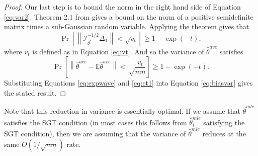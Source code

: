 \documentclass[twoside]{article}
\DeclareMathOperator*{\tr}{tr}
\newcommand{\zero}{\text{\textbf{0}}}
\newcommand{\E}{\mathbb{E}}
\newcommand{\w}{\theta}
\newcommand{\wave}{\hat\w^{ave}}
\newcommand{\wtave}{\E\hat\w^{ave}}
\newcommand{\wmle}{\hat\w^{mle}}
\newcommand{\wstar}{{\w^{*}}}
\newcommand{\I}{\mathcal I}
\newcommand{\normal}[2]{\ensuremath{\mathcal{N}\left({{#1}},{{#2}}\right)}}
\newcommand{\ltwo}[1]{{\lVert {#1} \rVert}}
\newcommand{\ltwobig}[1]{{\left\lVert {#1} \right\rVert}}
\newcommand{\prob}[1]{\Pr\left[{#1}\right]}
\begin{document}
\begin{proof}

Our last step is to bound the norm in the right hand side of Equation \ref{eq:var2}.
Theorem 2.1 from \cite{hsu2012tail} gives a bound on the norm of a positive semidefinite matrix times a sub-Gaussian random variable.
Applying the theorem gives that %
\begin{equation}
\prob{
    \ltwobig{\I^{-1/2}_\wstar\Delta_1} < \sqrt{v_t}
}
\ge 1-\exp(-t)
,
\end{equation}
where $v_t$ is defined as in Equation \ref{eq:vt}.
And so the variance of $\wave$ satisfies
\begin{equation}
\prob{
\ltwobig{\wave-\E\wave}
<
\sqrt\frac{v_t}{{mn}}
}
\ge 1-\exp(-t)
.
\label{eq:ct1}
\end{equation}
Substituting Equations \ref{eq:expwave} and \ref{eq:ct1} into Equation \ref{eq:biasvar} gives the stated result.
\end{proof}

Note that this reduction in variance is essentially optimal.
If we assume that $\wmle$ satisfies the SGT condition
(in most cases this follows from $\wmle_i$ satisfying the SGT condition),
then we are assuming that the variance of $\wmle$ reduces at the same $O(1/\sqrt{mn})$ rate.
\end{document}
